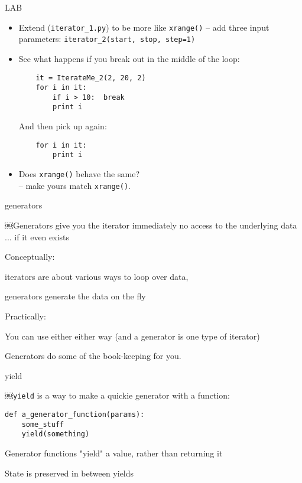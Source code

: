 \documentclass{beamer}
\begin{document}
\begin{frame}[fragile]{LAB}

\begin{itemize}
  \item  Extend (\verb|iterator_1.py|) to be more like \verb|xrange()| --
         add three input parameters: \verb|iterator_2(start, stop, step=1)|
  \item  See what happens if you break out in the middle of the loop:
\begin{verbatim}
    it = IterateMe_2(2, 20, 2)
    for i in it:
        if i > 10:  break
        print i
\end{verbatim}
And then pick up again:
\begin{verbatim}
    for i in it:
        print i
\end{verbatim}
  \item  Does \verb|xrange()| behave the same?\\
          -- make yours match \verb|xrange()|.
\end{itemize}
\end{frame}

\begin{frame}[fragile]{generators}

\Large{￼Generators give you the iterator immediately
no access to the underlying data ... if it even exists}

\vfill
\Large{ Conceptually:}

iterators are about various ways to loop over data,

generators generate the data on the fly

\vfill
\Large{ Practically:}

You can use either either way (and a generator is one type of iterator)

Generators do some of the book-keeping for you.

\end{frame}

\begin{frame}[fragile]{yield}

\Large{￼\verb|yield| is a way to make a quickie generator with a function:}

\begin{verbatim}
def a_generator_function(params):
    some_stuff
    yield(something)
\end{verbatim}

\vfill
\Large{ Generator functions "yield" a value, rather than returning it }

\vfill
\Large{ State is preserved in between yields }

\end{frame}
\end{document}
